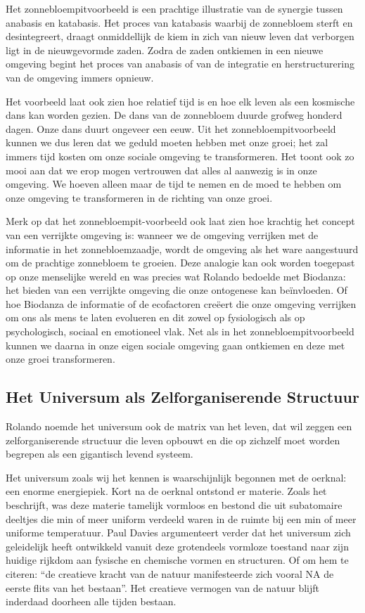\documentclass[
  11pt,
]{book}
\begin{document}
Het zonnebloempitvoorbeeld is een prachtige illustratie van de synergie tussen anabasis en katabasis. Het proces van katabasis waarbij de zonnebloem sterft en desintegreert, draagt onmiddellijk de kiem in zich van nieuw leven dat verborgen ligt in de nieuwgevormde zaden. Zodra de zaden ontkiemen in een nieuwe omgeving begint het proces van anabasis of van de integratie en herstructurering van de omgeving immers opnieuw.

Het voorbeeld laat ook zien hoe relatief tijd is en hoe elk leven als een kosmische dans kan worden gezien. De dans van de zonnebloem duurde grofweg honderd dagen. Onze dans duurt ongeveer een eeuw. Uit het zonnebloempitvoorbeeld kunnen we dus leren dat we geduld moeten hebben met onze groei; het zal immers tijd kosten om onze sociale omgeving te transformeren. Het toont ook zo mooi aan dat we erop mogen vertrouwen dat alles al aanwezig is in onze omgeving. We hoeven alleen maar de tijd te nemen en de moed te hebben om onze omgeving te transformeren in de richting van onze groei.

Merk op dat het zonnebloempit-voorbeeld ook laat zien hoe krachtig het concept van een verrijkte omgeving is: wanneer we de omgeving verrijken met de informatie in het zonnebloemzaadje, wordt de omgeving als het ware aangestuurd om de prachtige zonnebloem te groeien. Deze analogie kan ook worden toegepast op onze menselijke wereld en was precies wat Rolando bedoelde met Biodanza: het bieden van een verrijkte omgeving die onze ontogenese kan beïnvloeden. Of hoe Biodanza de informatie of de ecofactoren creëert die onze omgeving verrijken om ons als mens te laten evolueren en dit zowel op fysiologisch als op psychologisch, sociaal en emotioneel vlak. Net als in het zonnebloempitvoorbeeld kunnen we daarna in onze eigen sociale omgeving gaan ontkiemen en deze met onze groei transformeren.

\subsection{Het Universum als Zelforganiserende Structuur}\label{het-universum-als-zelforganiserende-structuur}

Rolando noemde het universum ook de matrix van het leven, dat wil zeggen een zelforganiserende structuur die leven opbouwt en die op zichzelf moet worden begrepen als een gigantisch levend systeem.

Het universum zoals wij het kennen is waarschijnlijk begonnen met de oerknal: een enorme energiepiek. Kort na de oerknal ontstond er materie. Zoals \citet{davies1987} het beschrijft, was deze materie tamelijk vormloos en bestond die uit subatomaire deeltjes die min of meer uniform verdeeld waren in de ruimte bij een min of meer uniforme temperatuur. Paul Davies argumenteert verder dat het universum zich geleidelijk heeft ontwikkeld vanuit deze grotendeels vormloze toestand naar zijn huidige rijkdom aan fysische en chemische vormen en structuren. Of om hem te citeren: ``de creatieve kracht van de natuur manifesteerde zich vooral NA de eerste flits van het bestaan''. Het creatieve vermogen van de natuur blijft inderdaad doorheen alle tijden bestaan.
\end{document}
